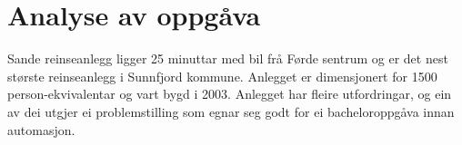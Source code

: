 \chapter{Analyse av oppgåva}
\thispagestyle{fancy}
Sande reinseanlegg ligger 25 minuttar med bil frå Førde sentrum og er det 
nest største reinseanlegg i Sunnfjord kommune. Anlegget er dimensjonert for 1500 person-ekvivalentar
og vart bygd i 2003. Anlegget har fleire utfordringar, og ein av dei utgjer ei problemstilling som egnar seg godt for ei
bacheloroppgåva innan automasjon.